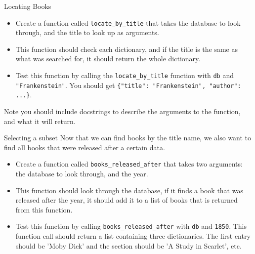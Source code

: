 \documentclass[10pt]{beamer}
\begin{document}
\begin{frame}[label={sec:org1adc0af},fragile]{Locating Books}
 \begin{itemize}
\item Create a function called \texttt{locate\_by\_title} that takes the database to look through,
and the title to look up as arguments.
\item This function should check each dictionary, and if the title is the same as what
was searched for, it should return the whole dictionary.
\item Test this function by calling the \texttt{locate\_by\_title} function with \texttt{db} and
\texttt{"Frankenstein"}. You should get \texttt{\{"title": "Frankenstein", "author": ...\}}.
\end{itemize}

\alert{Note} you should include docstrings to describe the arguments to the function, and
what it will return.
\end{frame}

\begin{frame}[label={sec:orgb10445f},fragile]{Selecting a subset}
 Now that we can find books by the title name, we also want to find all books that
were released after a certain data.

\begin{itemize}
\item Create a function called \texttt{books\_released\_after} that takes two arguments: the
database to look through, and the year.
\item This function should look through the database, if it finds a book that was
released after the year, it should add it to a list of books that is returned from
this function.
\item Test this function by calling \texttt{books\_released\_after} with \texttt{db} and \texttt{1850}. This function
call should return a list containing three dictionaries. The first entry should be
'Moby Dick' and the section should be 'A Study in Scarlet', etc.
\end{itemize}
\end{frame}
\end{document}
